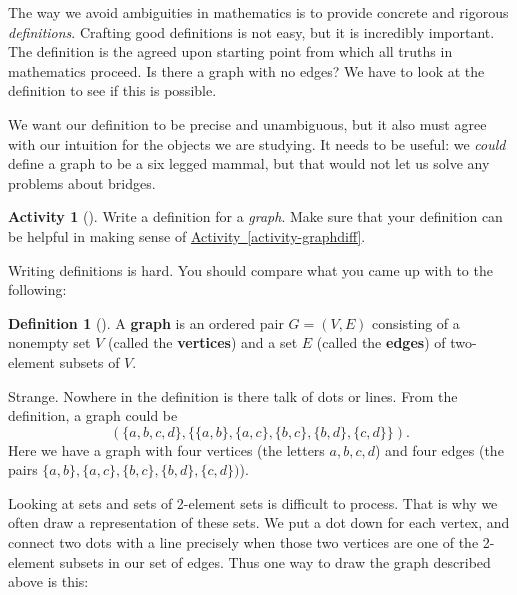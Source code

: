 \documentclass[10pt,]{book}
\newcommand{\terminology}[1]{\textbf{#1}}
\theoremstyle{plain}
\theoremstyle{definition}
\newtheorem{definition}[theorem]{Definition}
\theoremstyle{definition}
\theoremstyle{definition}
\newtheorem{activity}[project]{Activity}
\numberwithin{equation}{chapter}
\newcommand{\vtx}[2]{node[fill,circle,inner sep=0pt, minimum size=4pt,label=#1:#2]{}}
\newcommand{\vr}[1]{\vtx{right}{#1}}
\newcommand{\vl}[1]{\vtx{left}{#1}}
\begin{document}
The way we avoid ambiguities in mathematics is to provide concrete and rigorous \emph{definitions}.  Crafting good definitions is not easy, but it is incredibly important.  The definition is the agreed upon starting point from which all truths in mathematics proceed.  Is there a graph with no edges?  We have to look at the definition to see if this is possible.%
\par
\hypertarget{p-33}{}%
We want our definition to be precise and unambiguous, but it also must agree with our intuition for the objects we are studying.  It needs to be useful: we \emph{could} define a graph to be a six legged mammal, but that would not let us solve any problems about bridges.%
\begin{activity}[]\label{activity-3}
\hypertarget{p-34}{}%
Write a definition for a \emph{graph}.  Make sure that your definition can be helpful in making sense of \hyperref[activity-graphdiff]{Activity~\ref{activity-graphdiff}}.%
\end{activity}
\hypertarget{p-35}{}%
Writing definitions is hard.  You should compare what you came up with to the following:%
\begin{definition}[{}]\label{definition-1}
\hypertarget{p-36}{}%
A \terminology{graph} is an ordered pair \(G = (V, E)\) consisting of a nonempty set \(V\) (called the \terminology{vertices}) and a set \(E\) (called the \terminology{edges}) of two-element subsets of \(V\).%
\end{definition}
\hypertarget{p-37}{}%
Strange.  Nowhere in the definition is there talk of dots or lines.  From the definition, a graph could be%
\begin{equation*}
(\{a,b,c,d\}, \{\{a,b\}, \{a,c\}, \{b,c\}, \{b,d\}, \{c,d\}\}).
\end{equation*}
Here we have a graph with four vertices  (the letters \(a, b, c, d\)) and four edges (the pairs \(\{a,b\}, \{a,c\}, \{b,c\}, \{b,d\}, \{c,d\})\)).%
\par
\hypertarget{p-38}{}%
Looking at sets and sets of 2-element sets is difficult to process.  That is why we often draw a representation of these sets.  We put a dot down for each vertex, and connect two dots with a line precisely when those two vertices are one of the 2-element subsets in our set of edges.  Thus one way to draw the graph described above is this:%
\begin{sidebyside}{1}{0.375}{0.375}{0}
\begin{sbspanel}{0.25}
\resizebox{\linewidth}{!}{{
\begin{tikzpicture}[scale=0.7]
   \draw  (-1,1) \vl{\(a\)} -- (1,1) \vr{\(b\)} (-1,1) -- (-1,-1) \vl{\(c\)} -- (1,-1) \vr{\(d\)} -- (1,1) -- (-1,-1);
 \end{tikzpicture}
}
}
\end{sbspanel}
\end{sidebyside}
\end{document}
